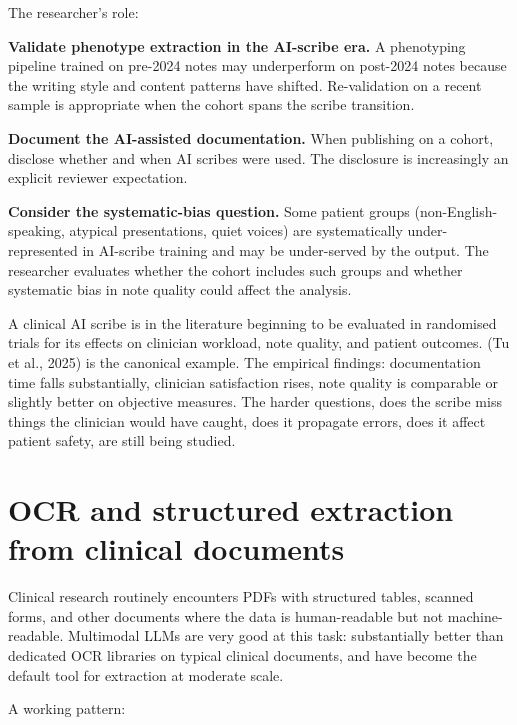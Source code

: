 \documentclass[
  letterpaper,
  11pt]{scrbook}
\begin{document}
The researcher's role:

\textbf{Validate phenotype extraction in the AI-scribe era.} A
phenotyping pipeline trained on pre-2024 notes may underperform on
post-2024 notes because the writing style and content patterns have
shifted. Re-validation on a recent sample is appropriate when the cohort
spans the scribe transition.

\textbf{Document the AI-assisted documentation.} When publishing on a
cohort, disclose whether and when AI scribes were used. The disclosure
is increasingly an explicit reviewer expectation.

\textbf{Consider the systematic-bias question.} Some patient groups
(non-English-speaking, atypical presentations, quiet voices) are
systematically under-represented in AI-scribe training and may be
under-served by the output. The researcher evaluates whether the cohort
includes such groups and whether systematic bias in note quality could
affect the analysis.

A clinical AI scribe is in the literature beginning to be evaluated in
randomised trials for its effects on clinician workload, note quality,
and patient outcomes. ({Tu et al.}, 2025) is the canonical example. The
empirical findings: documentation time falls substantially, clinician
satisfaction rises, note quality is comparable or slightly better on
objective measures. The harder questions, does the scribe miss things
the clinician would have caught, does it propagate errors, does it
affect patient safety, are still being studied.

\section{OCR and structured extraction from clinical
documents}\label{ocr-and-structured-extraction-from-clinical-documents}

Clinical research routinely encounters PDFs with structured tables,
scanned forms, and other documents where the data is human-readable but
not machine- readable. Multimodal LLMs are very good at this task:
substantially better than dedicated OCR libraries on typical clinical
documents, and have become the default tool for extraction at moderate
scale.

A working pattern:
\end{document}
